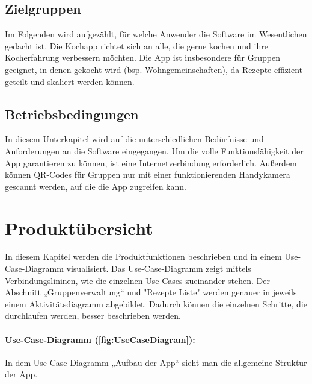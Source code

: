 \documentclass[parskip=full]{scrartcl}
\begin{document}
\subsection{Zielgruppen}
Im Folgenden wird aufgezählt, für welche Anwender die Software im Wesentlichen gedacht ist. \newline
Die Kochapp richtet sich an alle, die gerne kochen und ihre Kocherfahrung verbessern möchten.
Die App ist insbesondere für Gruppen geeignet, in denen gekocht wird (bsp. Wohngemeinschaften), da Rezepte effizient geteilt und skaliert werden können.

\subsection{Betriebsbedingungen}
In diesem Unterkapitel wird auf die unterschiedlichen Bedürfnisse und Anforderungen an die Software eingegangen. \newline
Um die volle Funktionsfähigkeit der App garantieren zu können, ist eine Internetverbindung erforderlich. Außerdem können QR-Codes für Gruppen nur mit einer funktionierenden Handykamera gescannt werden, auf die die App zugreifen kann.

\section{Produktübersicht}
In diesem Kapitel werden die Produktfunktionen beschrieben und in einem Use-Case-Diagramm visualisiert.
Das Use-Case-Diagramm zeigt mittels Verbindungslininen, wie die einzelnen Use-Cases zueinander stehen.
Der Abschnitt „Gruppenverwaltung“ und "Rezepte Liste" werden genauer in jeweils einem Aktivitätsdiagramm abgebildet.
Dadurch können die einzelnen Schritte, die durchlaufen werden, besser beschrieben werden.\par


\paragraph{Use-Case-Diagramm (\autoref{fig:UseCaseDiagram}):}

In dem Use-Case-Diagramm „Aufbau der App“ sieht man die allgemeine Struktur der App.
\end{document}
